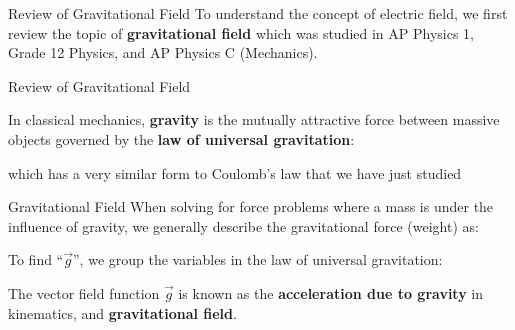 \documentclass[12pt,aspectratio=169]{beamer}
\begin{document}
\begin{frame}{Review of Gravitational Field}
  To understand the concept of electric field, we first review the topic of
  \textbf{gravitational field} which was studied in AP Physics 1, Grade 12
  Physics, and AP Physics C (Mechanics).
\end{frame}



\begin{frame}{Review of Gravitational Field}
  \begin{center}
  \end{center}
  In classical mechanics, \textbf{gravity} is the mutually attractive force
  between massive objects governed by the \textbf{law of universal gravitation}:


  which has a very similar form to Coulomb's law that we have just studied
\end{frame}


\begin{frame}{Gravitational Field}
  When solving for force problems where a mass is under the influence of
  gravity, we generally describe the gravitational force (weight) as:
  

  To find ``$\vec g$'', we group the variables in the law of universal
  gravitation:
    

  The vector field function $\vec g$ is known as the \textbf{acceleration due
    to gravity} in kinematics, and \textbf{gravitational field}.
\end{frame}
\end{document}

